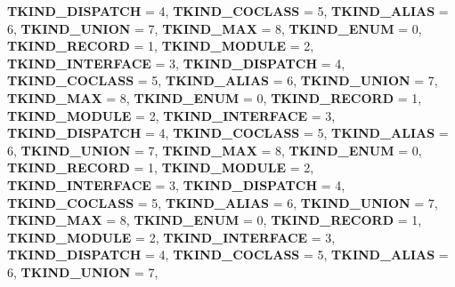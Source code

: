 \begin{DoxyCompactItemize}
\newline
{\bfseries T\+K\+I\+N\+D\+\_\+\+D\+I\+S\+P\+A\+T\+CH} = 4, 
{\bfseries T\+K\+I\+N\+D\+\_\+\+C\+O\+C\+L\+A\+SS} = 5, 
{\bfseries T\+K\+I\+N\+D\+\_\+\+A\+L\+I\+AS} = 6, 
{\bfseries T\+K\+I\+N\+D\+\_\+\+U\+N\+I\+ON} = 7, 
\newline
{\bfseries T\+K\+I\+N\+D\+\_\+\+M\+AX} = 8, 
{\bfseries T\+K\+I\+N\+D\+\_\+\+E\+N\+UM} = 0, 
{\bfseries T\+K\+I\+N\+D\+\_\+\+R\+E\+C\+O\+RD} = 1, 
{\bfseries T\+K\+I\+N\+D\+\_\+\+M\+O\+D\+U\+LE} = 2, 
\newline
{\bfseries T\+K\+I\+N\+D\+\_\+\+I\+N\+T\+E\+R\+F\+A\+CE} = 3, 
{\bfseries T\+K\+I\+N\+D\+\_\+\+D\+I\+S\+P\+A\+T\+CH} = 4, 
{\bfseries T\+K\+I\+N\+D\+\_\+\+C\+O\+C\+L\+A\+SS} = 5, 
{\bfseries T\+K\+I\+N\+D\+\_\+\+A\+L\+I\+AS} = 6, 
\newline
{\bfseries T\+K\+I\+N\+D\+\_\+\+U\+N\+I\+ON} = 7, 
{\bfseries T\+K\+I\+N\+D\+\_\+\+M\+AX} = 8, 
{\bfseries T\+K\+I\+N\+D\+\_\+\+E\+N\+UM} = 0, 
{\bfseries T\+K\+I\+N\+D\+\_\+\+R\+E\+C\+O\+RD} = 1, 
\newline
{\bfseries T\+K\+I\+N\+D\+\_\+\+M\+O\+D\+U\+LE} = 2, 
{\bfseries T\+K\+I\+N\+D\+\_\+\+I\+N\+T\+E\+R\+F\+A\+CE} = 3, 
{\bfseries T\+K\+I\+N\+D\+\_\+\+D\+I\+S\+P\+A\+T\+CH} = 4, 
{\bfseries T\+K\+I\+N\+D\+\_\+\+C\+O\+C\+L\+A\+SS} = 5, 
\newline
{\bfseries T\+K\+I\+N\+D\+\_\+\+A\+L\+I\+AS} = 6, 
{\bfseries T\+K\+I\+N\+D\+\_\+\+U\+N\+I\+ON} = 7, 
{\bfseries T\+K\+I\+N\+D\+\_\+\+M\+AX} = 8, 
{\bfseries T\+K\+I\+N\+D\+\_\+\+E\+N\+UM} = 0, 
\newline
{\bfseries T\+K\+I\+N\+D\+\_\+\+R\+E\+C\+O\+RD} = 1, 
{\bfseries T\+K\+I\+N\+D\+\_\+\+M\+O\+D\+U\+LE} = 2, 
{\bfseries T\+K\+I\+N\+D\+\_\+\+I\+N\+T\+E\+R\+F\+A\+CE} = 3, 
{\bfseries T\+K\+I\+N\+D\+\_\+\+D\+I\+S\+P\+A\+T\+CH} = 4, 
\newline
{\bfseries T\+K\+I\+N\+D\+\_\+\+C\+O\+C\+L\+A\+SS} = 5, 
{\bfseries T\+K\+I\+N\+D\+\_\+\+A\+L\+I\+AS} = 6, 
{\bfseries T\+K\+I\+N\+D\+\_\+\+U\+N\+I\+ON} = 7, 
{\bfseries T\+K\+I\+N\+D\+\_\+\+M\+AX} = 8, 
\newline
{\bfseries T\+K\+I\+N\+D\+\_\+\+E\+N\+UM} = 0, 
{\bfseries T\+K\+I\+N\+D\+\_\+\+R\+E\+C\+O\+RD} = 1, 
{\bfseries T\+K\+I\+N\+D\+\_\+\+M\+O\+D\+U\+LE} = 2, 
{\bfseries T\+K\+I\+N\+D\+\_\+\+I\+N\+T\+E\+R\+F\+A\+CE} = 3, 
\newline
{\bfseries T\+K\+I\+N\+D\+\_\+\+D\+I\+S\+P\+A\+T\+CH} = 4, 
{\bfseries T\+K\+I\+N\+D\+\_\+\+C\+O\+C\+L\+A\+SS} = 5, 
{\bfseries T\+K\+I\+N\+D\+\_\+\+A\+L\+I\+AS} = 6, 
{\bfseries T\+K\+I\+N\+D\+\_\+\+U\+N\+I\+ON} = 7, 

\end{DoxyCompactItemize}
